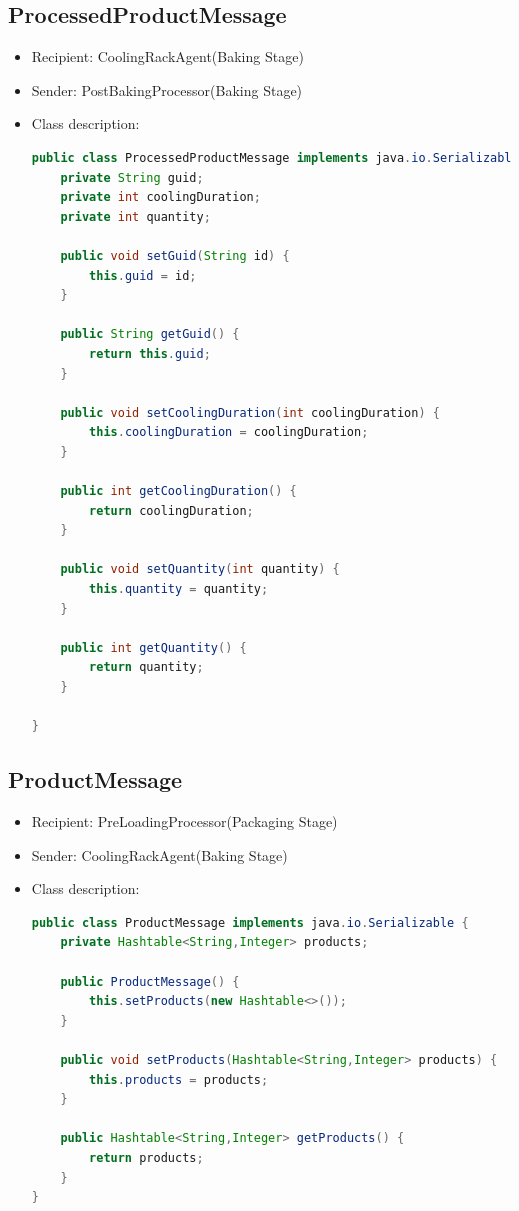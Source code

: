 \documentclass[12pt]{article}
\begin{document}
\subsection{ProcessedProductMessage}
\begin{itemize}
\item Recipient: CoolingRackAgent(Baking Stage)
\item Sender: PostBakingProcessor(Baking Stage)
\item Class description:
\begin{lstlisting}[language=Java]
public class ProcessedProductMessage implements java.io.Serializable {
    private String guid;
    private int coolingDuration;
    private int quantity;
    
    public void setGuid(String id) {
        this.guid = id;
    }

    public String getGuid() {
        return this.guid;
    }

    public void setCoolingDuration(int coolingDuration) {
        this.coolingDuration = coolingDuration;
    }

    public int getCoolingDuration() {
        return coolingDuration;
    }

    public void setQuantity(int quantity) {
        this.quantity = quantity;
    }

    public int getQuantity() {
        return quantity;
    }

}
\end{lstlisting}
\end{itemize}
\subsection{ProductMessage}
\begin{itemize}
\item Recipient: PreLoadingProcessor(Packaging Stage)
\item Sender: CoolingRackAgent(Baking Stage)
\item Class description:
\begin{lstlisting}[language=Java]
public class ProductMessage implements java.io.Serializable {
    private Hashtable<String,Integer> products;
    
    public ProductMessage() {
        this.setProducts(new Hashtable<>());
    }

    public void setProducts(Hashtable<String,Integer> products) {
        this.products = products;
    }

    public Hashtable<String,Integer> getProducts() {
        return products;
    }
}
\end{lstlisting}
\end{itemize}
\end{document}
